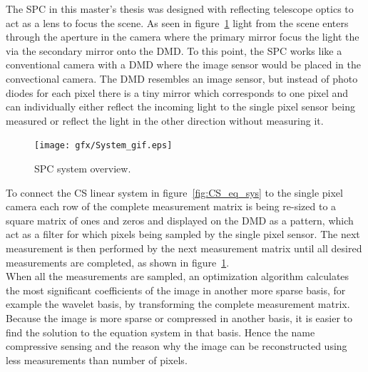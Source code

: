The SPC in this master's thesis was designed with reflecting telescope optics to act as a lens to focus the scene. As seen in figure~\ref{fig:system_overview} light from the scene enters through the aperture in the camera where the primary mirror focus the light the via the secondary mirror onto the DMD. To this point, the SPC works like a conventional camera with a DMD where the image sensor would be placed in the convectional camera. The DMD resembles an image sensor, but instead of photo diodes for each pixel there is a tiny mirror which corresponds to one pixel and can individually either reflect the incoming light to the single pixel sensor being measured or reflect the light in the other direction without measuring it.




\begin{figure}[H]
\centering
\texttt{[image: gfx/System\_gif.eps]}
	\caption{SPC system overview.}
	\label{fig:system_overview}
\end{figure}	

To connect the CS linear system in figure~\ref{fig:CS_eq_sys} to the single pixel camera each row of the complete measurement matrix is being re-sized to a square matrix of ones and zeros and displayed on the DMD as a pattern, which act as a filter for which pixels being sampled by the single pixel sensor. The next measurement is then performed by the next measurement matrix until all desired measurements are completed, as shown in figure~\ref{fig:system_overview}.\\[0.1in]

When all the measurements are sampled, an optimization algorithm calculates the most significant coefficients of the image in another more sparse basis, for example the wavelet basis, by transforming the complete measurement matrix. Because the image is more sparse or compressed in another basis, it is easier to find the solution to the equation system in that basis. Hence the name compressive sensing and the reason why the image can be reconstructed using less measurements than number of pixels.    







